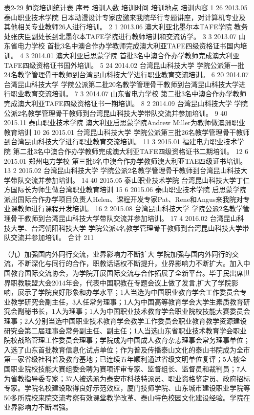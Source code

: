 表2-29  师资培训统计表
序号
培训人数
培训时间
培训地点
培训内容
1
26
2013.05
泰山职业技术学院
日本动漫设计专家应邀来我院举行专题讲座，对计算机专业及其他相关专业教师26人进行培训。
2
1
2013.06
澳大利亚北墨尔本TAFE学院
教务处张庆臣副处长到北墨尔本TAFE学院进行教师培训和交流访学。
3
3
2013.07
山东省电力学校
首批3名中澳合作办学教师完成澳大利亚TAFE四级资格证书国内培训。
4
3
2014.01
澳大利亚启思蒙学院
首批3名中澳合作办学教师完成澳大利亚TAFE四级资格证书国外培训。
5
24
2014.02
台湾昆山科技大学
学院公派第一批24名教学管理骨干教师到台湾昆山科技大学进行职业教育交流培训。
6
20
2014.07
台湾昆山科技大学
学院公派第二批20名教学管理骨干教师到台湾昆山科技大学进行职业教育交流培训。
7
3
2014.07
山东省电力学校
第二批3名中澳合作办学教师完成澳大利亚TAFE四级资格证书一期培训。
8
2
2014.09
台湾昆山科技大学
学院公派2名教学管理骨干教师到台湾昆山科技大学带队交流并参加培训。
9
40
2015.11
泰山职业技术学院
澳大利亚启思蒙学院Andrew Miller为教师做澳洲职业教育培训
10
26
2015.01
台湾昆山科技大学
学院公派第三批26名教学管理骨干教师到台湾昆山科技大学进行职业教育交流培训。
11
3
2015.01
福建电力职业技术学院
第二批3名中澳合作办学教师完成澳大利亚TAFE四级资格证书二期培训。
12
6
2015.01
郑州电力学校
第三批6名中澳合作办学教师澳大利亚TAE四级证书培训。
13
2
2015.02
台湾昆山科技大学
学院公派2名教学管理骨干教师到台湾昆山科技大学带队交流并参加培训。
14
40
2015.05
泰山职业技术学院
台湾昆山科技大学丁仁方国际长为师生做台湾职业教育培训
15
6
2015.06
泰山职业技术学院
启思蒙学院派出国际合作办学项目负责人Helen、课程开发专家Pat、Rene和Angus来我院对专业课教师进行课程开发培训。
16
2
2015.08
台湾昆山科技大学
学院公派2名教学管理骨干教师到台湾昆山科技大学带队交流并参加培训。
17
4
2016.02
台湾昆山科技大学、台湾朝阳科技大学
学院公派4名教学管理骨干教师到台湾昆山科技大学带队交流并参加培训。
合计
211



（九）加强国内外同行交流，业界影响力不断扩大
学院加强与国内外同行的交流，不断深化与同行的合作，职教话语权不断提升，业界影响力不断扩大。加入中国教育国际交流协会，为学院开展国际交流与合作拓展了全新平台。毕于民出席世界职教联盟大会2014年会，代表中国职教在专题会议上做了发言,扩大了学院影响，展示了学院良好形象和办学水平；1人当选为中国职业教育学会工作委员会专业教学研究会副主任，3人任常务理事；1人为中国高等教育学会大学生素质教育研究会副秘书长，1人为理事；1人为中国职业技术教育学会职业院校技能大赛委员会理事；2人分别当选中国职业技术教育学会教学工作委员会职业教育教学资源建设研究会第二届理事会常务副主任、副主任；1人当选山东省职业技术教育学会职业院校战略管理工作委员会理事；学院成为中国成人教育杂志理事会常务理事单位；入选了山东首批教育信息化试点单位；作为普及传播泰山文化的泰山书院成为全市第一家省级社科普及教育基地；已连续五年顺利通过省级文明单位复评；5人被全国职业院校技能大赛组委会聘为赛项评审专家、监督组长、监督员和裁判员；7人为省教指导委专家；37人被选派为泰安市科技特派员、职业资格鉴定员、政府招标专家。学院名校建设取得良好示范效应，厦门技师学院、山东城市建设职业学院等50多所院校来院交流考察有效课堂教学改革、泰山特色校园文化建设经验。学院在业界影响力不断增强。


